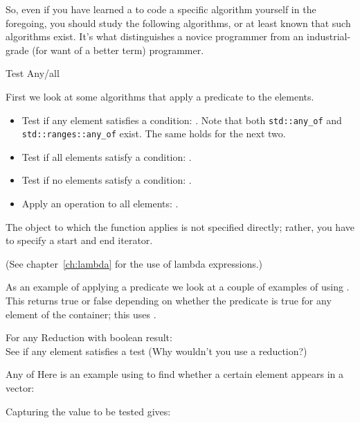 So, even if you have learned a to code a specific algorithm yourself
in the foregoing,
you should study the following algorithms,
or at least known that such algorithms exist.
It's what distinguishes a novice programmer
from an industrial-grade (for want of a better term) programmer.

 {Test Any/all}
\label{sec:alg-iter}

First we look at some algorithms that apply a predicate
to the elements.
\begin{itemize}
\item Test if any element satisfies a condition:
  .
  Note that both \lstinline{std::any_of} and
  \lstinline{std::ranges::any_of} exist.
  The same holds for the next two.
\item Test if all elements satisfy a condition:
  .
\item Test if no elements satisfy a condition:
  .
\item Apply an operation to all elements: .
\end{itemize}

The object to which the function applies is not specified directly; 
rather, you have to specify a start
and end iterator.

(See 
chapter~\ref{ch:lambda} for the use of lambda expressions.)

As an example of applying a predicate we look at a couple of examples
of using .
This returns true or false depending on whether the predicate is true
for any element of the container;
this uses .

\begin{block}{For any}
  \label{sl:alg-any}
  Reduction with boolean result:\\
  See if any element satisfies a test
  (Why wouldn't you use a  reduction?)
\end{block}

\begin{block}{Any of}
  \label{sl:lambda-any}
  Here is an example using  to find
  whether a certain  element appears in a vector:
\end{block}

Capturing the value to be tested gives:
%

